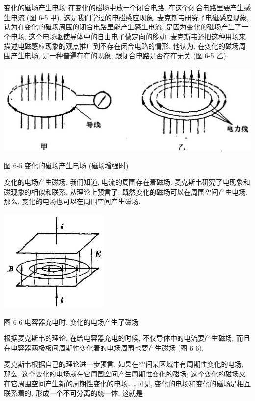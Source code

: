 \documentclass[10pt]{article}
\begin{document}
变化的磁场产生电场 在变化的磁场中放一个闭合电路, 在这个闭合电路里要产生感生电流 (图 6-5 甲). 这是我们学过的电磁感应现象. 麦克斯韦研究了电磁感应现象, 认为在变化的磁场周围的闭合电路里能产生感生电流, 是因为变化的磁场产生了一个电场, 这个电场驱使导体中的自由电子做定向的移动. 麦克斯韦还把这种用场来描述电磁感应现象的观点推广到不存在闭合电路的情形. 他认为, 在变化的磁场周围产生电场, 是一种普遍存在的现象, 跟闭合电路是否存在无关 (图 6-5 乙).

\begin{center}
\includegraphics[max width=1.0\textwidth]{images/01913056-1f15-74d8-9184-9aab52c9d66b_199_840730.jpg}
\end{center}

图 6-5 变化的磁场产生电场 (磁场增强时)

变化的电场产生磁场. 我们知道, 电流的周围存在着磁场. 麦克斯韦研究了电现象和磁现象的相似和联系, 从理论上预言了: 既然变化的磁场可以在周围空间产生电场, 那么, 变化的电场也可以在周围空间产生磁场.

\begin{center}
\includegraphics[max width=0.4\textwidth]{images/01913056-1f15-74d8-9184-9aab52c9d66b_199_549313.jpg}
\end{center}

图 6-6 电容器充电时, 变化的电场产生了磁场

根据麦克斯韦的理论, 在给电容器充电的时候, 不仅导体中的电流要产生磁场, 而且在电容器两极板间周期性变化着的电场周围也要产生磁场 (图 6-6).

麦克斯韦根据自己的理论进一步预言, 如果在空间某区域中有周期性变化的电场, 那么, 这个变化的电场就在它周围空间产生周期性变化的磁场; 这个变化的磁场又在它周围空间产生新的周期性变化的电场……可见, 变化的电场和变化的磁场是相互联系着的, 形成一个不可分离的统一体, 这就是
\end{document}

